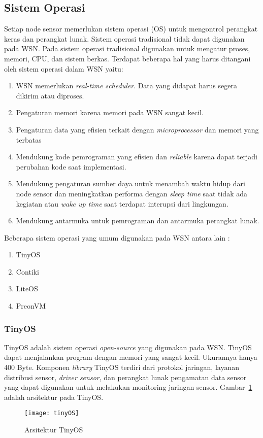 \subsection{Sistem Operasi}
Setiap node sensor memerlukan sistem operasi (OS) untuk mengontrol perangkat keras dan perangkat lunak. Sistem operasi tradisional tidak dapat digunakan pada WSN. Pada sistem operasi tradisional digunakan untuk mengatur proses, memori, CPU, dan sistem berkas. Terdapat beberapa hal yang harus ditangani oleh sistem operasi dalam WSN yaitu:
\begin{enumerate}
	\item WSN memerlukan \textit{real-time scheduler}. Data yang didapat harus segera dikirim atau diproses.
	\item Pengaturan memori karena memori pada WSN sangat kecil.
	\item Pengaturan data yang efisien terkait dengan \textit{microprocessor} dan memori yang terbatas
	\item Mendukung kode pemrograman yang efisien dan \textit{reliable} karena dapat terjadi perubahan kode saat implementasi.
	\item Mendukung pengaturan sumber daya untuk menambah waktu hidup dari node sensor dan meningkatkan performa dengan \textit{sleep time} saat tidak ada kegiatan atau \textit{wake up time} saat terdapat interupsi dari lingkungan.
	\item Mendukung antarmuka untuk pemrograman dan antarmuka perangkat lunak. 
\end{enumerate}

Beberapa sistem operasi yang umum digunakan pada WSN antara lain :
\begin{enumerate}
	\item TinyOS
	\item Contiki
	\item LiteOS
	\item PreonVM
\end{enumerate}

\subsubsection{TinyOS}
TinyOS adalah sistem operasi \textit{open-source} yang digunakan pada WSN. TinyOS dapat menjalankan program dengan memori yang sangat kecil. Ukurannya hanya 400 Byte. Komponen \textit{library} TinyOS terdiri dari protokol jaringan, layanan distribusi sensor, \textit{driver sensor}, dan perangkat lunak pengamatan data sensor yang dapat digunakan untuk melakukan monitoring jaringan sensor. Gambar~\ref{fig:tinyOS} adalah arsitektur pada TinyOS. 
\begin{figure} [H]
	\centering  
	\texttt{[image: tinyOS]}  
	\caption[Arsitektur TinyOS]{Arsitektur TinyOS} 
	\label{fig:tinyOS} 
\end{figure}

